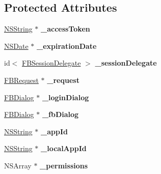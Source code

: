 \subsection*{\-Protected \-Attributes}
\begin{DoxyCompactItemize}
\item 
\hypertarget{interface_facebook_a76d77c1d62efdd7f698cc27f6e97fe28}{
\hyperlink{class_n_s_string}{\-N\-S\-String} $\ast$ {\bfseries \-\_\-access\-Token}}
\label{interface_facebook_a76d77c1d62efdd7f698cc27f6e97fe28}

\item 
\hypertarget{interface_facebook_ae601fb2f6ad09b3cd4f453207c78ad38}{
\hyperlink{class_n_s_date}{\-N\-S\-Date} $\ast$ {\bfseries \-\_\-expiration\-Date}}
\label{interface_facebook_ae601fb2f6ad09b3cd4f453207c78ad38}

\item 
\hypertarget{interface_facebook_ad1d039539adeceeddb93e1fff0d41fd6}{
id$<$ \hyperlink{protocol_f_b_session_delegate-p}{\-F\-B\-Session\-Delegate} $>$ {\bfseries \-\_\-session\-Delegate}}
\label{interface_facebook_ad1d039539adeceeddb93e1fff0d41fd6}

\item 
\hypertarget{interface_facebook_a3f6c9790678d4976d5d60713cc39dbeb}{
\hyperlink{interface_f_b_request}{\-F\-B\-Request} $\ast$ {\bfseries \-\_\-request}}
\label{interface_facebook_a3f6c9790678d4976d5d60713cc39dbeb}

\item 
\hypertarget{interface_facebook_a7ec31908a33b3a253276b9595fce2827}{
\hyperlink{interface_f_b_dialog}{\-F\-B\-Dialog} $\ast$ {\bfseries \-\_\-login\-Dialog}}
\label{interface_facebook_a7ec31908a33b3a253276b9595fce2827}

\item 
\hypertarget{interface_facebook_a670f8365753e44ee5b6a757bacd834c5}{
\hyperlink{interface_f_b_dialog}{\-F\-B\-Dialog} $\ast$ {\bfseries \-\_\-fb\-Dialog}}
\label{interface_facebook_a670f8365753e44ee5b6a757bacd834c5}

\item 
\hypertarget{interface_facebook_ab5821a2dd6b7dfa5a6ae991af36dc9c9}{
\hyperlink{class_n_s_string}{\-N\-S\-String} $\ast$ {\bfseries \-\_\-app\-Id}}
\label{interface_facebook_ab5821a2dd6b7dfa5a6ae991af36dc9c9}

\item 
\hypertarget{interface_facebook_a9ae3c70745eddbd6cdff97086f3121eb}{
\hyperlink{class_n_s_string}{\-N\-S\-String} $\ast$ {\bfseries \-\_\-local\-App\-Id}}
\label{interface_facebook_a9ae3c70745eddbd6cdff97086f3121eb}

\item 
\hypertarget{interface_facebook_a4c3300da7473c89f70b008408dc7bcd7}{
\-N\-S\-Array $\ast$ {\bfseries \-\_\-permissions}}
\label{interface_facebook_a4c3300da7473c89f70b008408dc7bcd7}

\end{DoxyCompactItemize}
